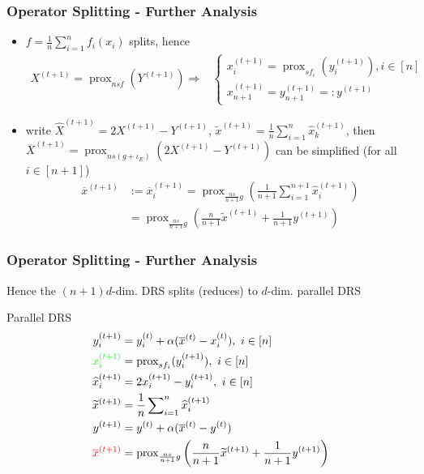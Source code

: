 
\begin{frame}
\frametitle{Operator Splitting - Further Analysis}

\begin{itemize}
    \item $f = \frac{1}{n}\sum_{i=1}^n f_i(x_i)$ splits, hence
    \begin{align*}
        X^{(t+1)} = \operatorname{prox}_{nsf}(Y^{(t+1)}) \Rightarrow & \begin{cases} x_i^{(t+1)} = \operatorname{prox}_{sf_i}(y_i^{(t+1)}), i\in [n] \\
        x_{n+1}^{(t+1)} = y_{n+1}^{(t+1)} =: y^{(t+1)} \end{cases}
    \end{align*}
    \item write $\widehat{X}^{(t+1)} = 2X^{(t+1)} - Y^{(t+1)}$, $\widetilde{x}^{(t+1)} = \frac{1}{n}\sum_{i=1}^n \widehat{x}_k^{(t+1)}$, then $\overline{X}^{(t+1)} = \operatorname{prox}_{ns(g + \iota_E)}(2X^{(t+1)} - Y^{(t+1)})$ can be simplified (for all $i\in[n+1]$)
    \begin{align*}
        \overline{x}^{(t+1)} & := \overline{x}_i^{(t+1)} = \operatorname{prox}_{\frac{ns}{n+1}g} \left( \frac{1}{n+1} \sum_{i=1}^{n+1} \widehat{x}_i^{(t+1)} \right) \\
        & = \operatorname{prox}_{\frac{ns}{n+1}g} \left( \frac{n}{n+1} \widetilde{x}^{(t+1)} + \frac{1}{n+1} y^{(t+1)} \right)
    \end{align*}
\end{itemize}

\end{frame}


\begin{frame}
\frametitle{Operator Splitting - Further Analysis}

Hence the $(n+1)d$-dim. DRS splits (reduces) to $d$-dim. parallel DRS

\begin{block}{Parallel DRS}
\ 
\vspace{-1.3em}
\begin{align*}
y_i^{(t+1)} & = y_i^{(t)} + \alpha (\overline{x}^{(t)} - x_i^{(t)}), \ i \in [n] \\
{\color{green} x_i^{(t+1)} } & = \operatorname{prox}_{sf_i} (y_i^{(t+1)}), \ i \in [n] \\
\widehat{x}_i^{(t+1)} & = 2x_i^{(t+1)} - y_i^{(t+1)}, \ i \in [n] \\
\widetilde{x}^{(t+1)} & = \frac{1}{n}\sum\nolimits_{i=1}^n \widehat{x}_i^{(t+1)} \\
y^{(t+1)} & =  y^{(t)} + \alpha (\overline{x}^{(t)} - y^{(t)}) \\
{\color{red} \overline{x}^{(t+1)} } & = \operatorname{prox}_{\frac{ns}{n+1}g} \left( \frac{n}{n+1} \widetilde{x}^{(t+1)} + \frac{1}{n+1} y^{(t+1)} \right)
\end{align*}
\end{block}

\end{frame}


